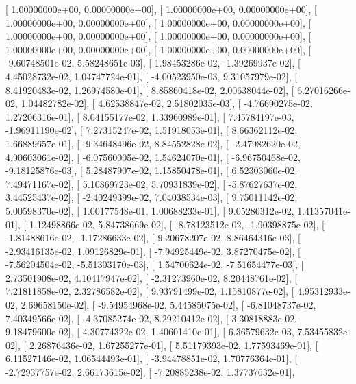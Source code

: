 \documentclass{article}
\begin{document}
       [  1.00000000e+00,   0.00000000e+00],
       [  1.00000000e+00,   0.00000000e+00],
       [  1.00000000e+00,   0.00000000e+00],
       [  1.00000000e+00,   0.00000000e+00],
       [  1.00000000e+00,   0.00000000e+00],
       [  1.00000000e+00,   0.00000000e+00],
       [  1.00000000e+00,   0.00000000e+00],
       [  1.00000000e+00,   0.00000000e+00],
       [ -9.60748501e-02,   5.58248651e-03],
       [  1.98453286e-02,  -1.39269937e-02],
       [  4.45028732e-02,   1.04747724e-01],
       [ -4.00523950e-03,   9.31057979e-02],
       [  8.41920483e-02,   1.26974580e-01],
       [  8.85860418e-02,   2.00638044e-02],
       [  6.27016266e-02,   1.04482782e-02],
       [  4.62538847e-02,   2.51802035e-03],
       [ -4.76690275e-02,   1.27206316e-01],
       [  8.04155177e-02,   1.33960989e-01],
       [  7.45784197e-03,  -1.96911190e-02],
       [  7.27315247e-02,   1.51918053e-01],
       [  8.66362112e-02,   1.66889657e-01],
       [ -9.34648496e-02,   8.84552828e-02],
       [ -2.47982620e-02,   4.90603061e-02],
       [ -6.07560005e-02,   1.54624070e-01],
       [ -6.96750468e-02,  -9.18125876e-03],
       [  5.28487907e-02,   1.15850478e-01],
       [  6.52303060e-02,   7.49471167e-02],
       [  5.10869723e-02,   5.70931839e-02],
       [ -5.87627637e-02,   3.44525437e-02],
       [ -2.40249399e-02,   7.04038534e-03],
       [  9.75011142e-02,   5.00598370e-02],
       [  1.00177548e-01,   1.00688233e-01],
       [  9.05286312e-02,   1.41357041e-01],
       [  1.12498866e-02,   5.84738669e-02],
       [ -8.78123512e-02,  -1.90398875e-02],
       [ -1.81488616e-02,  -1.17286633e-02],
       [  9.20678207e-02,   8.86464316e-03],
       [ -2.93416135e-02,   1.09126829e-01],
       [ -7.94925449e-02,   3.87270475e-02],
       [ -7.56204504e-02,  -5.51303170e-03],
       [  1.54700624e-02,  -7.51654477e-03],
       [  2.73501908e-02,   4.10417947e-02],
       [ -2.31273960e-02,   8.20448761e-02],
       [  7.21811858e-02,   2.32786582e-02],
       [  9.93791499e-02,   1.15810877e-02],
       [  4.95312933e-02,   2.69658150e-02],
       [ -9.54954968e-02,   5.44585075e-02],
       [ -6.81048737e-02,   7.40349566e-02],
       [ -4.37085274e-02,   8.29210412e-02],
       [  3.30818883e-02,   9.18479600e-02],
       [  4.30774322e-02,   1.40601410e-01],
       [  6.36579632e-03,   7.53455832e-02],
       [  2.26876436e-02,   1.67255277e-01],
       [  5.51179393e-02,   1.77593469e-01],
       [  6.11527146e-02,   1.06544493e-01],
       [ -3.94478851e-02,   1.70776364e-01],
       [ -2.72937757e-02,   2.66173615e-02],
       [ -7.20885238e-02,   1.37737632e-01],
\end{document}
